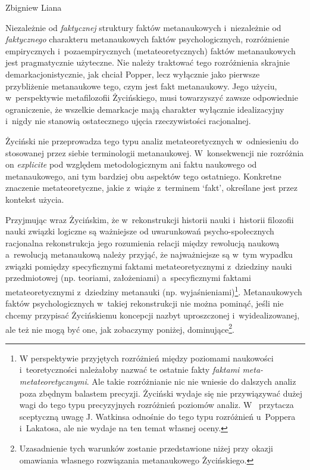 \begin{artplenv}{Zbigniew Liana}
\begin{uwaga}
Niezależnie od \textit{faktycznej} struktury faktów metanaukowych i~niezależnie od \textit{faktycznego} charakteru
metanaukowych faktów psychologicznych, rozróżnienie empirycznych i~pozaempirycznych (metateoretycznych) faktów
metanaukowych jest pragmatycznie użyteczne. Nie należy traktować tego rozróżnienia skrajnie demarkacjonistycznie, jak
chciał Popper, lecz wyłącznie jako pierwsze przybliżenie metanaukowe tego, czym jest fakt metanaukowy. Jego użyciu, w~perspektywie
metafilozofii Życińskiego, musi towarzyszyć zawsze odpowiednie ograniczenie, że wszelkie demarkacje mają
charakter wyłącznie idealizacyjny i~nigdy nie stanowią ostatecznego ujęcia rzeczywistości racjonalnej.
\end{uwaga}

\begin{uwaga}
Życiński nie przeprowadza tego typu analiz metateoretycznych w~odniesieniu do stosowanej przez siebie
terminologii metanaukowej. W~konsekwencji nie rozróżnia on \textit{explicite} pod względem metodologicznym ani faktu
naukowego od metanaukowego, ani tym bardziej obu aspektów tego ostatniego. Konkretne znaczenie metateoretyczne,
jakie z~wiąże z~terminem `fakt', określane jest przez kontekst użycia.
\end{uwaga}
	
Przyjmując wraz Życińskim, że w~rekonstrukcji historii nauki i~historii filozofii nauki związki logiczne są ważniejsze
od uwarunkowań psycho-społecznych racjonalna rekonstrukcja jego rozumienia relacji między rewolucją naukową a~rewolucją
metanaukową należy przyjąć, że najważniejsze są w~tym wypadku związki pomiędzy specyficznymi faktami
metateoretycznymi z~dziedziny nauki przedmiotowej (np. teoriami, założeniami) a~specyficznymi faktami metateoretycznymi z~dziedziny
metanauki (np. wyjaśnieniami)\footnote{W perspektywie przyjętych rozróżnień między poziomami naukowości i~teoretyczności
należałoby nazwać te ostatnie fakty \textit{faktami meta-metateoretycznymi}. Ale takie rozróżnianie nic
nie wniesie do dalszych analiz poza zbędnym balastem precyzji. Życiński wydaje się nie przywiązywać dużej wagi do tego
typu precyzyjnych rozróżnień poziomów analiz.
W~\parencite[s.~123]{zycinski_jezyk_1983}
przytacza sceptyczną uwagę J. Watkinsa odnośnie do tego typu rozróżnień u~Poppera i~Lakatosa, ale nie wydaje na
ten temat własnej oceny.}. Metanaukowych faktów psychologicznych w~takiej rekonstrukcji nie można pominąć, jeśli nie
chcemy przypisać Życińskiemu koncepcji nazbyt uproszczonej i~wyidealizowanej, ale też nie mogą być one, jak zobaczymy
poniżej, dominujące\footnote{Uzasadnienie tych warunków zostanie przedstawione niżej przy okazji omawiania własnego
rozwiązania metanaukowego Życińskiego.}.


\end{artplenv}

